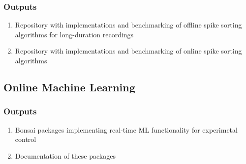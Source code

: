 \documentclass[12pt]{article}
\begin{document}
\subsubsection{Outputs}

\begin{enumerate}

    \item Repository with implementations and benchmarking of offline spike
        sorting algorithms for long-duration recordings

    \item Repository with implementations and benchmarking of online spike
        sorting algorithms

\end{enumerate}

\subsection{Online Machine Learning}

\subsubsection{Outputs}

\begin{enumerate}

    \item Bonsai packages implementing real-time ML functionality for experimetal control

    \item Documentation of these packages

\end{enumerate}

\end{document}
